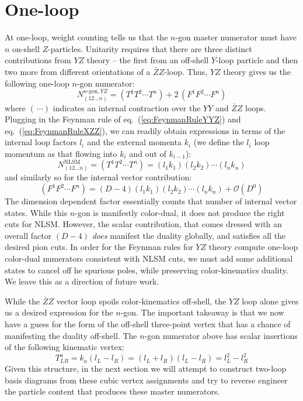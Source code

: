 \documentclass[12pt,letter]{article}
\def\eqn#1{eq.~(\ref{#1})}
\def\be{\begin{equation}}
\def\ee{\end{equation}}
\begin{document}
\section{One-loop}
At one-loop, weight counting tells us that the $n$-gon master numerator must have $n$ on-shell $Z$-particles. Unitarity requires that there are three distinct contributions from $Y\!Z$ theory -- the first from an off-shell $Y$-loop particle and then two more from different orientations of a $\bar{Z}Z$-loop.  Thus, $Y\!Z$ theory gives us the following one-loop $n$-gon numerator:
\be
N^{n\text{-gon},YZ}_{(12...n)} = (T^{1}T^{2}\cdots T^{n})+2\, (F^1F^2\cdots F^n)
\ee
where $(\,\cdots)$ indicates an internal contraction over the $YY$ and $\bar{Z}Z$ loops. Plugging in the Feynman rule of \eqn{eq:FeynmanRuleYYZ} and \eqn{eq:FeynmanRuleXZZ}, we can readily obtain expressions in terms of the internal loop factors $l_i$ and the external momenta $k_i$ (we define the $l_i$ loop momentum as that flowing into $k_i$ and out of $k_{i-1}$):
\be
N_{(12...n)}^{\text{NLSM}}=(T^{1}T^{2}\cdots T^{n}) = (l_1 k_1)(l_2 k_2) \cdots (l_n k_n)
\ee
and similarly so for the internal vector contribution:
\be
 (F^1F^2\cdots F^n) = (D-4)(l_1 k_1)(l_2 k_2) \cdots (l_n k_n) + \mathcal{O}(D^0)
\ee
The dimension dependent factor essentially counts that number of internal vector states. While this $n$-gon is manifestly color-dual, it does not produce the right cuts for NLSM. However, the scalar contribution, that comes dressed with an overall factor $(D-4)$ \textit{does} manifest the duality globally, and satisfies all the desired pion cuts. In order for the Feynman rules for $Y\!Z$ theory compute one-loop color-dual numerators consistent with NLSM cuts, we must add some additional states to cancel off he spurious poles, while preserving color-kinematics duality. We leave this as a direction of future work. 

While the $\bar{Z}Z$ vector loop spoils color-kinematics off-shell, the $Y\!Z$ loop alone gives us a desired expression for the $n$-gon. The important takeaway is that we now have a guess for the form of the off-shell three-point vertex that has a chance of manifesting the duality off-shell. The $n$-gon numerator above has scalar insertions of the following kinematic vertex:
\be
T^{a}_{LR} = k_a(l_L-l_{R}) = (l_L+l_{R}) (l_L-l_{R})  = l_L^2-l_{R}^2 
\ee
Given this structure, in the next section we will attempt to construct two-loop basis diagrams from these cubic vertex assignments and try to reverse engineer the particle content that produces these master numerators.
\end{document}
